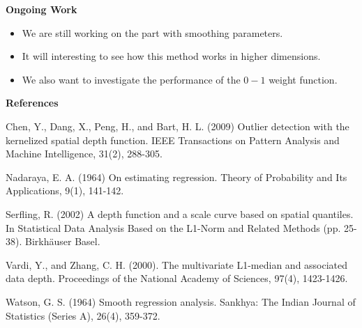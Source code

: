 \documentclass[11pt]{article}
\begin{document}
\begin{flushleft}
\vspace{0.1in}
\textbf{Ongoing Work}
\vspace{0.1in}
\begin{itemize}
 \item We are still working on the part with smoothing parameters.
 \item It will interesting to see how this method works in higher dimensions.
 \item We also want to investigate the performance of the $0-1$ weight function.
\end{itemize}


\vspace{0.2in}
\textbf{References}
\vspace{0.1in}

\small

Chen, Y., Dang, X., Peng, H., and Bart, H. L. (2009) Outlier detection with the kernelized spatial depth function. IEEE Transactions on Pattern Analysis and Machine Intelligence, 31(2), 288-305.
\vspace{0.05in}


Nadaraya, E. A. (1964) On estimating regression. Theory of Probability and Its Applications, 9(1), 141-142.
\vspace{0.05in}

Serfling, R. (2002) A depth function and a scale curve based on spatial quantiles. In Statistical Data Analysis Based on the L1-Norm and Related Methods (pp. 25-38). Birkhäuser Basel.
\vspace{0.05in}

Vardi, Y., and Zhang, C. H. (2000). The multivariate L1-median and associated data depth. Proceedings of the National Academy of Sciences, 97(4), 1423-1426.
\vspace{0.05in}

Watson, G. S. (1964) Smooth regression analysis. Sankhya: The Indian Journal of Statistics (Series A), 26(4), 359-372.

\end{flushleft}
\end{document}
